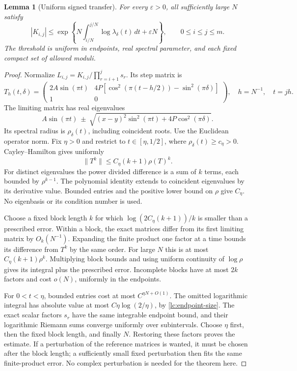 \documentclass[11pt]{article}
\numberwithin{equation}{section}
\newtheorem{lemma}[theorem]{Lemma}
\theoremstyle{remark}\newtheorem{remark}[theorem]{Remark}
\begin{document}
\begin{lemma}[Uniform signed transfer]\label{lc:slow-transfer}
For every \(\varepsilon>0\), all sufficiently large \(N\) satisfy
\begin{equation}\label{lc:transfer-estimate}
 |K_{i,j}|\le
 \exp\left\{N\int_{i/N}^{j/N}\log\lambda_\delta(t)\,dt+\varepsilon N\right\},
                      \qquad0\le i\le j\le m.
\end{equation}
The threshold is uniform in endpoints, real spectral parameter,
and each fixed compact set of allowed moduli.
\end{lemma}
\begin{proof}
Normalize \(L_{i,j}=K_{i,j}/\prod_{r=i+1}^js_r\). Its step matrix is
\[
 T_h(t,\delta)=
 \begin{pmatrix}
 2A\sin(\pi t)&4P[\cos^2(\pi(t-h/2))-\sin^2(\pi\delta)]\\1&0
 \end{pmatrix},\quad h=N^{-1},\quad t=jh.
\]
The limiting matrix has real eigenvalues
\[
 A\sin(\pi t)\ \pm\
       \sqrt{(x-y)^2\sin^2(\pi t)+4P\cos^2(\pi\delta)}.
\]
Its spectral radius is \(\rho_\delta(t)\), including coincident roots.
Use the Euclidean operator norm. Fix \(\eta>0\) and restrict to
\(t\in[\eta,1/2]\), where
\(\rho_\delta(t)\ge c_\eta>0\). Cayley--Hamilton gives uniformly
\begin{equation}\label{lc:constant-power}
                    \|T^k\|\le C_\eta(k+1)\rho(T)^k .
\end{equation}
For distinct eigenvalues the power divided difference is a sum of
\(k\) terms, each bounded by \(\rho^{k-1}\). The polynomial identity
extends to coincident eigenvalues by its derivative value. Bounded
entries and the positive lower bound on \(\rho\) give \(C_\eta\).
No eigenbasis or its condition number is used.

Choose a fixed block length \(k\) for which
\(\log(2C_\eta(k+1))/k\) is smaller than a prescribed error.
Within a block, the exact matrices differ from its first limiting
matrix by \(O_k(N^{-1})\). Expanding the finite product one factor
at a time bounds its difference from \(T^k\) by the same order.
For large \(N\) this is at most \(C_\eta(k+1)\rho^k\).
Multiplying block bounds and using uniform continuity of \(\log\rho\)
gives its integral plus the prescribed error. Incomplete blocks have
at most \(2k\) factors and cost \(o(N)\), uniformly in the endpoints.

For \(0<t<\eta\), bounded entries cost at most \(C^{\eta N+O(1)}\).
The omitted logarithmic integral has absolute value at most
\(C\eta\log(2/\eta)\), by \eqref{lc:endpoint-size}.
The exact scalar factors \(s_r\) have the same integrable endpoint
bound, and their logarithmic Riemann sums converge uniformly over
subintervals. Choose \(\eta\) first, then the fixed block length,
and finally \(N\). Restoring these factors proves the estimate.
If a perturbation of the reference matrices is wanted, it must be
chosen after the block length; a sufficiently small fixed perturbation
then fits the same finite-product error. No complex perturbation is
needed for the theorem here.
\end{proof}
\end{document}

